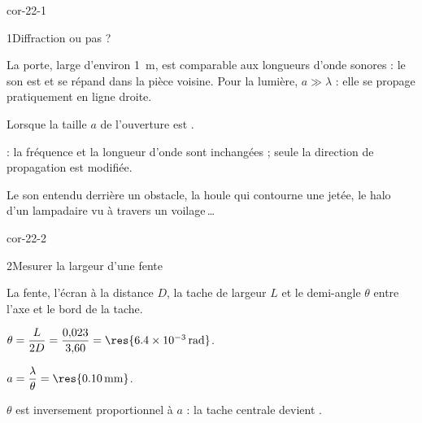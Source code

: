 \corrigesSouples

\begin{blocLivre}{cor-22-1}
\begin{corrige}{1}{Diffraction ou pas ?}
\begin{questions}
\item La porte, large d'environ \qty{1}{m}, est comparable aux longueurs d'onde sonores : le son est 
et se répand dans la pièce voisine. Pour la lumière, $a\gg\lambda$ : elle se propage pratiquement en ligne droite.
\item Lorsque la taille $a$ de l'ouverture est .
\item {} : la fréquence et la longueur d'onde sont inchangées ; seule la direction de propagation est modifiée.
\item Le son entendu derrière un obstacle, la houle qui contourne une jetée, le halo d'un lampadaire vu à travers un
voilage\,\dots
\end{questions}
\end{corrige}
\end{blocLivre}
\begin{blocLivre}{cor-22-2}
\begin{corrige}{2}{Mesurer la largeur d'une fente}
\begin{questions}
\item La fente, l'écran à la distance $D$, la tache de largeur $L$ et le demi-angle $\theta$ entre l'axe et le bord de la tache.
\item $\theta=\dfrac{L}{2D}=\dfrac{0{,}023}{3{,}60}=\res{\qty{6,4e-3}{rad}}$.
\item $a=\dfrac{\lambda}{\theta}=\res{\qty{0,10}{mm}}$.
\item $\theta$ est inversement proportionnel à $a$ : la tache centrale devient .
\end{questions}
\end{corrige}
\end{blocLivre}
